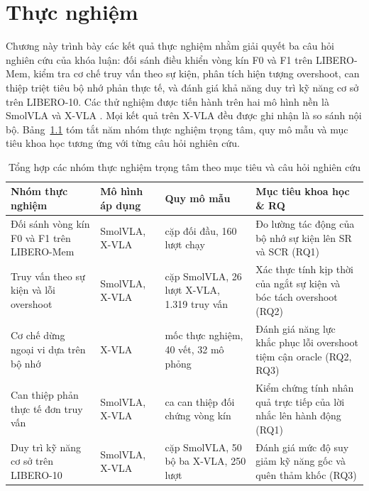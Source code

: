 \chapter{Thực nghiệm}

Chương này trình bày các kết quả thực nghiệm nhằm giải quyết ba câu hỏi nghiên cứu của khóa luận: đối sánh điều khiển vòng kín F0 và F1 trên LIBERO-Mem, kiểm tra cơ chế truy vấn theo sự kiện, phân tích hiện tượng overshoot, can thiệp triệt tiêu bộ nhớ phản thực tế, và đánh giá khả năng duy trì kỹ năng cơ sở trên LIBERO-10. Các thử nghiệm được tiến hành trên hai mô hình nền là SmolVLA \cite{smolvla2025} và X-VLA \cite{xvla2025}. Mọi kết quả trên X-VLA đều được ghi nhận là so sánh nội bộ. Bảng~\ref{tab:experiment-rq-map} tóm tắt năm nhóm thực nghiệm trọng tâm, quy mô mẫu và mục tiêu khoa học tương ứng với từng câu hỏi nghiên cứu.

\begin{table}[htbp]
\centering\small
\caption{Tổng hợp các nhóm thực nghiệm trọng tâm theo mục tiêu và câu hỏi nghiên cứu}
\label{tab:experiment-rq-map}
\setlength{\tabcolsep}{4pt}
\begin{tabular}{>{\raggedright\arraybackslash}p{}|>{\raggedright\arraybackslash}p{}|>{\raggedright\arraybackslash}p{}|>{\raggedright\arraybackslash}p{}}
\toprule
\textbf{Nhóm thực nghiệm} & \textbf{Mô hình áp dụng} & \textbf{Quy mô mẫu} & \textbf{Mục tiêu khoa học \& RQ} \\
\midrule
Đối sánh vòng kín F0 và F1 trên LIBERO-Mem & SmolVLA, X-VLA & 80 cặp đối đầu, 160 lượt chạy & Đo lường tác động của bộ nhớ sự kiện lên SR và SCR (RQ1) \\
\midrule
Truy vấn theo sự kiện và lỗi overshoot & SmolVLA, X-VLA & 40 cặp SmolVLA, 26 lượt X-VLA, 1.319 truy vấn & Xác thực tính kịp thời của ngắt sự kiện và bóc tách overshoot (RQ2) \\
\midrule
Cơ chế dừng ngoại vi dựa trên bộ nhớ & X-VLA & 35 mốc thực nghiệm, 40 vết, 32 mô phỏng & Đánh giá năng lực khắc phục lỗi overshoot tiệm cận oracle (RQ2, RQ3) \\
\midrule
Can thiệp phản thực tế đơn truy vấn & SmolVLA, X-VLA & 3 ca can thiệp đối chứng vòng kín & Kiểm chứng tính nhân quả trực tiếp của lời nhắc lên hành động (RQ1) \\
\midrule
Duy trì kỹ năng cơ sở trên LIBERO-10 & SmolVLA, X-VLA & 50 cặp SmolVLA, 50 bộ ba X-VLA, 250 lượt & Đánh giá mức độ suy giảm kỹ năng gốc và quên thảm khốc (RQ3) \\
\bottomrule
\end{tabular}
\end{table}

